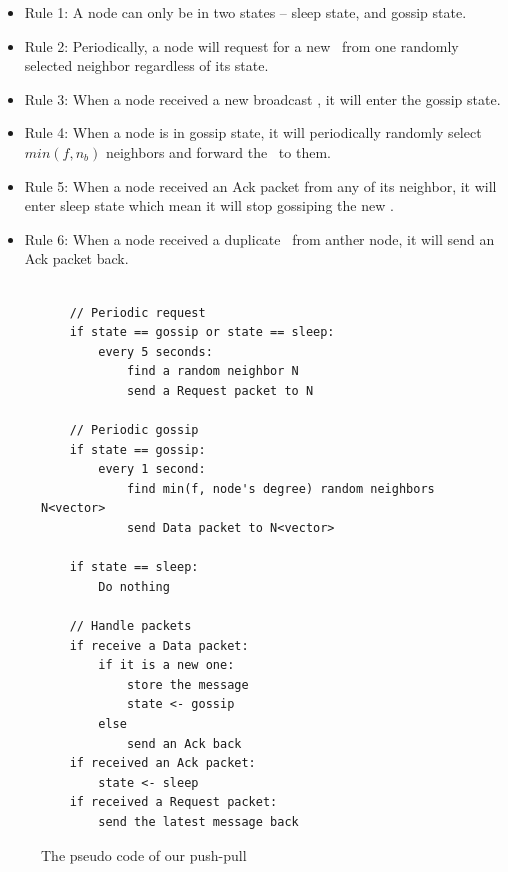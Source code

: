 \begin{itemize}
	\item Rule 1: A node can only be in two states -- sleep state, and gossip state.
	\item Rule 2: Periodically, a node will request for a new \msg ~from one randomly selected neighbor regardless of its state.
	\item Rule 3: When a node received a new broadcast \msg, it will enter the gossip state.
	\item Rule 4: When a node is in gossip state, it will periodically randomly select $min(f, n_b)$ neighbors and forward the \msg ~to them.
	\item Rule 5: When a node received an Ack packet from any of its neighbor, it will enter sleep state which mean it will stop gossiping the new \msg.
	\item Rule 6: When a node received a duplicate \msg ~from anther node, it will send an Ack packet back. 
\end{itemize}

\begin{figure}[!htbp]
	\centering
	\begin{Verbatim}[fontsize=\small]
	
	// Periodic request 
	if state == gossip or state == sleep:
		every 5 seconds:
			find a random neighbor N
			send a Request packet to N
	
	// Periodic gossip	
	if state == gossip:
		every 1 second:
			find min(f, node's degree) random neighbors N<vector>
			send Data packet to N<vector>
	
	if state == sleep:
		Do nothing
	
	// Handle packets
	if receive a Data packet:
		if it is a new one:
			store the message
			state <- gossip
		else
			send an Ack back
	if received an Ack packet:
		state <- sleep
	if received a Request packet:
		send the latest message back	
	\end{Verbatim}
	\caption{The pseudo code of our push-pull \gp}
	\label{fig:pseudo}
\end{figure}

